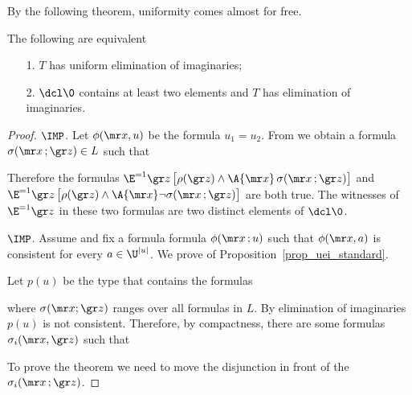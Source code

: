 By the following theorem, uniformity comes almost for free.

\begin{theorem}\label{thm_ei_unif} The following are equivalent
\begin{itemize}
\item[1.] $T$ has uniform elimination of imaginaries;
\item[2.] $\dcl\0$ contains at least two elements and $T$ has elimination of imaginaries.
\end{itemize}
\end{theorem}


\begin{proof}$\IMP$.
Let $\phi({\mr x},u)$ be the formula $u_1=u_2$.
From  we obtain a formula $\sigma({\mr x}\,;{\gr z})\in L$ such that 


Therefore the formulas $\E^{=1} {\gr z}\,\big[\rho({\gr z})\wedge\A {\mr x}\,\sigma({\mr x}\,;{\gr z})\big]$ and $\E^{=1} {\gr z}\,\big[\rho({\gr z})\wedge\A {\mr x}\neg\sigma({\mr x}\,;{\gr z})\big]$ are both true.
The witnesses of $\E^{=1} {\gr z}$ in these two formulas are two distinct elements of $\dcl\0$.

$\IMP$.
Assume  and fix a formula formula $\phi({\mr x}\,;u)$ such that $\phi({\mr x},a)$ is consistent for every $a\in\U^{|u|}$.
We prove  of Proposition~\ref{prop_uei_standard}.

Let $p(u)$ be the type that contains the formulas


where $\sigma({\mr x};{\gr z})$ ranges over all formulas in $L$.
By elimination of imaginaries $p(u)$ is not consistent.
Therefore, by compactness, there are some formulas $\sigma_i({\mr x},{\gr z})$ such that


To prove the theorem we need to move the disjunction in front of the $\sigma_i({\mr x}\,;{\gr z})$.


\end{proof}
